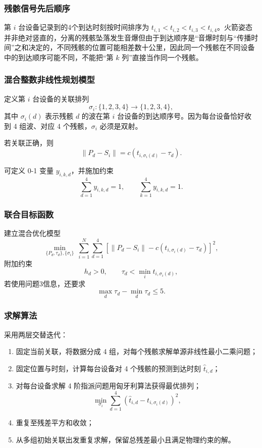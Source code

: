 \documentclass[12pt,a4paper]{article}
\begin{document}
\subsubsection{残骸信号先后顺序}

第 $i$ 台设备记录到的4个到达时刻按时间排序为 $t_{i,1}<t_{i,2}<t_{i,3}<t_{i,4}$。火箭姿态并非绝对竖直的，分离的残骸坠落发生音爆但由于到达顺序是“音爆时刻与“传播时间”之和决定的，不同残骸的位置可能相差数十公里，因此同一个残骸在不同设备中的到达顺序可能不同，不能把“第 $k$ 列”直接当作同一个残骸。

\subsubsection{混合整数非线性规划模型}

定义第 $i$ 台设备的关联排列
\[
\sigma_i:\{1,2,3,4\}\to\{1,2,3,4\},
\]
其中 $\sigma_i(d)$ 表示残骸 $d$ 的波在第 $i$ 台设备的到达顺序号。因为每台设备恰好收到 4 组波、对应 4 个残骸，$\sigma_i$ 必须是双射。

若关联正确，则
\[
\|P_d-S_i\|=c\left(t_{i,\sigma_i(d)}-\tau_d\right).
\]

可定义 0-1 变量 $y_{i,k,d}$，并施加约束
\[
\sum_{d=1}^{4}y_{i,k,d}=1,\qquad
\sum_{k=1}^{4}y_{i,k,d}=1.
\]

\subsubsection{联合目标函数}

建立混合优化模型
\[
\min_{\{P_d,\tau_d\},\{\sigma_i\}}\ 
\sum_{i=1}^{N}\sum_{d=1}^{4}
\left[
\|P_d-S_i\|-c\left(t_{i,\sigma_i(d)}-\tau_d\right)
\right]^2,
\]
附加约束
\[
h_d>0,\qquad \tau_d<\min_i t_{i,\sigma_i(d)},
\]
若使用问题3信息，还要求
\[
\max_{d}\tau_d-\min_{d}\tau_d\le 5.
\]

\subsubsection{求解算法}

采用两层交替迭代：

\begin{enumerate}[label=\arabic*.]
  \item 固定当前关联，将数据分成 4 组，对每个残骸求解单源非线性最小二乘问题；
  \item 固定位置与时刻，计算每台设备对 4 个残骸的预测到达时刻 $\hat t_{i,d}$；
  \item 对每台设备求解 4 阶指派问题用匈牙利算法获得最优排列；
  \[
  \min_{\sigma_i}\sum_{d=1}^{4}\left(\hat t_{i,d}-t_{i,\sigma_i(d)}\right)^2,
  \]
  \item 重复至残差平方和收敛；
  \item 从多组初始关联出发重复求解，保留总残差最小且满足物理约束的解。
\end{enumerate}
\end{document}
